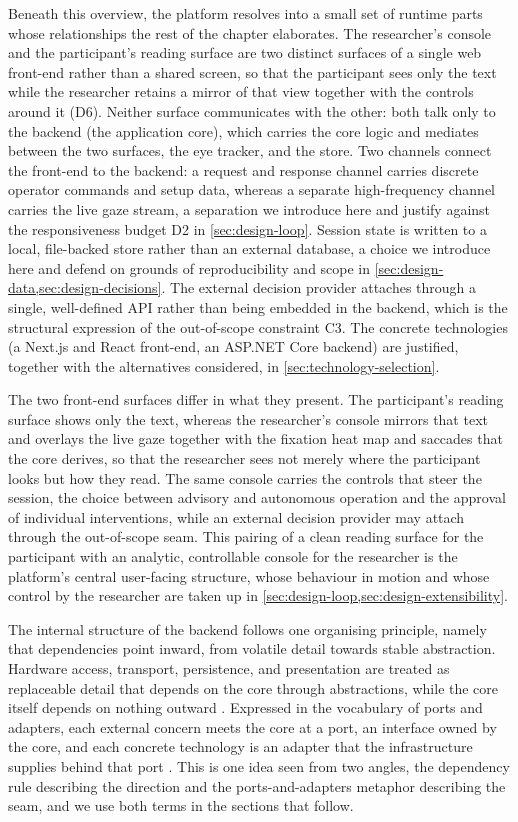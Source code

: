 Beneath this overview, the platform resolves into a small set of runtime parts whose relationships the rest of the chapter elaborates.
The researcher's console and the participant's reading surface are two distinct surfaces of a single web front-end rather than a shared screen, so that the participant sees only the text while the researcher retains a mirror of that view together with the controls around it (D6).
Neither surface communicates with the other: both talk only to the backend (the application core), which carries the core logic and mediates between the two surfaces, the eye tracker, and the store.
Two channels connect the front-end to the backend: a request and response channel carries discrete operator commands and setup data, whereas a separate high-frequency channel carries the live gaze stream, a separation we introduce here and justify against the responsiveness budget D2 in \cref{sec:design-loop}.
Session state is written to a local, file-backed store rather than an external database, a choice we introduce here and defend on grounds of reproducibility and scope in \cref{sec:design-data,sec:design-decisions}.
The external decision provider attaches through a single, well-defined API rather than being embedded in the backend, which is the structural expression of the out-of-scope constraint C3.
The concrete technologies (a Next.js and React front-end, an ASP.NET Core backend) are justified, together with the alternatives considered, in \cref{sec:technology-selection}.

The two front-end surfaces differ in what they present.
The participant's reading surface shows only the text, whereas the researcher's console mirrors that text and overlays the live gaze together with the fixation heat map and saccades that the core derives, so that the researcher sees not merely where the participant looks but how they read.
The same console carries the controls that steer the session, the choice between advisory and autonomous operation and the approval of individual interventions, while an external decision provider may attach through the out-of-scope seam.
This pairing of a clean reading surface for the participant with an analytic, controllable console for the researcher is the platform's central user-facing structure, whose behaviour in motion and whose control by the researcher are taken up in \cref{sec:design-loop,sec:design-extensibility}.

The internal structure of the backend follows one organising principle, namely that dependencies point inward, from volatile detail towards stable abstraction.
Hardware access, transport, persistence, and presentation are treated as replaceable detail that depends on the core through abstractions, while the core itself depends on nothing outward \cite{martin2017cleanarch, martin1996dip}.
Expressed in the vocabulary of ports and adapters, each external concern meets the core at a port, an interface owned by the core, and each concrete technology is an adapter that the infrastructure supplies behind that port \cite{cockburn2005hexagonal}.
This is one idea seen from two angles, the dependency rule describing the direction and the ports-and-adapters metaphor describing the seam, and we use both terms in the sections that follow.

